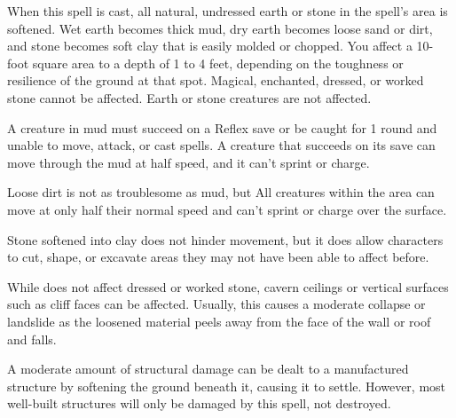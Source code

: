 \spellrng{\rngclose}
\begin{spelleffect}
  When this spell is cast, all natural, undressed earth or stone in the spell's area is softened. Wet earth becomes thick mud, dry earth becomes loose sand or dirt, and stone becomes soft clay that is easily molded or chopped. You affect a 10-foot square area to a depth of 1 to 4 feet, depending on the toughness or resilience of the ground at that spot. Magical, enchanted, dressed, or worked stone cannot be affected. Earth or stone creatures are not affected.
  \par A creature in mud must succeed on a Reflex save or be caught for 1 round and unable to move, attack, or cast spells. A creature that succeeds on its save can move through the mud at half speed, and it can't sprint or charge.
  \par Loose dirt is not as troublesome as mud, but All creatures within the area can move at only half their normal speed and can't sprint or charge over the surface.
  \par Stone softened into clay does not hinder movement, but it does allow characters to cut, shape, or excavate areas they may not have been able to affect before.
  \par While  does not affect dressed or worked stone, cavern ceilings or vertical surfaces such as cliff faces can be affected. Usually, this causes a moderate collapse or landslide as the loosened material peels away from the face of the wall or roof and falls.
  \par A moderate amount of structural damage can be dealt to a manufactured structure by softening the ground beneath it, causing it to settle. However, most well-built structures will only be damaged by this spell, not destroyed.
\end{spelleffect}

